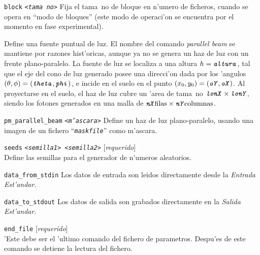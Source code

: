 \begin{Uentry}
\item[\texttt{block} \quad
  \texttt{<\emph{tama~no}>}]
%
  Fija el tama~no de bloque en n'umero de ficheros, cuando se opera en
  ``modo de bloques'' (este modo de operaci'on se encuentra por el
  momento en fase experimental).

\item[\texttt{parallel\_beam} \quad
  \texttt{
    <\emph{theta}>  <\emph{phi}>  %
    <\emph{oX}>  <\emph{oY}>  %
    <\emph{lonX}>  <\emph{lonY}>  %
    <\emph{nX}>  <\emph{nY}>  %
    <\emph{altura}>}]
%
  Define una fuente puntual de luz.  El nombre del comando
  \emph{parallel beam} se mantiene por razones hist'oricas, aunque ya
  no se genera un haz de luz con un frente plano-paralelo. La fuente
  de luz se localiza a una altura $h=\texttt{\emph{altura}}$, tal que
  el eje del cono de luz generado posee una direcci'on dada por los
  'angulos
  $(\theta,\phi)=(\texttt{\emph{theta}},\texttt{\emph{phi}})$, e
  incide en el suelo en el punto
  $(x_0,y_0)=(\texttt{\emph{oY}},\texttt{\emph{oX}})$.  Al proyectarse
  en el suelo, el haz de luz cubre un 'area de tama~no
  $\texttt{\emph{lonX}} \times \texttt{\emph{lonY}}$, siendo los
  fotones generados en una malla de $\texttt{\emph{nX}} \text{filas}
  \times \texttt{\emph{nY}} \text{columnas}$.

\item[\texttt{pm\_parallel\_beam} \quad
  \texttt{<\emph{m'ascara}>}]
%
  Define un haz de luz plano-paralelo, usando una imagen de un fichero
  ``\texttt{\emph{maskfile}}'' como m'ascara.

\item[\texttt{seeds} \quad
  \texttt{<\emph{semilla1}>  <\emph{semilla2}>}]
%
  [\emph{requerido}] \\
  Define las semillas para el generador de n'umeros aleatorios.

\item[\texttt{data\_from\_stdin}]
%
  Los datos de entrada son leidos directamente desde la \emph{Entrada
    Est'andar}.
  
\item[\texttt{data\_to\_stdout}]
%
  Los datos de salida son grabados directamente en la \emph{Salida
    Est'andar}.

\item[\texttt{end\_file}]
%
  [\emph{requerido}] \\
  'Este debe ser el 'ultimo comando del fichero de parametros.
  Despu'es de este comando se detiene la lectura del fichero.

\end{Uentry}

